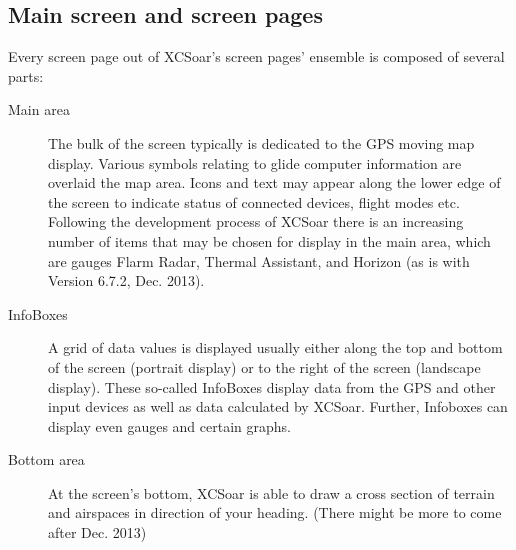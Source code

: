 \subsection*{Main screen and screen pages}
Every screen page out of XCSoar's screen pages' ensemble is composed of several
parts:
\begin{description}
\item[Main area] The bulk of the screen typically is dedicated to the GPS moving
map display. Various symbols relating to glide computer information are overlaid
the map area. Icons and text may appear along the lower edge of the screen
to indicate status of connected devices, flight modes etc.
Following the development process of XCSoar there is an increasing number of
items that may be chosen for display in the main area, which are gauges
Flarm Radar, Thermal Assistant, and Horizon (as is with Version 6.7.2,
Dec. 2013).
\item[InfoBoxes] A grid of data values is displayed usually either along
the top and bottom of the screen (portrait display) or to the right of the
screen (landscape display).  These so-called InfoBoxes display data from the
GPS and other input devices as well as data calculated by XCSoar. Further,
Infoboxes can display even gauges and certain graphs.
\item[Bottom area] At the screen's bottom, XCSoar is able to draw a cross
section of terrain and airspaces in direction of your heading. (There might be
more to come after Dec. 2013)
\end{description}

